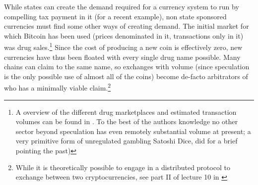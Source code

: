 While states can create the demand required for a currency system to run by compelling tax payment in it (for a recent example), non state sponsored currencies must find some other ways of creating demand.
The initial market for which Bitcoin has been used (prices denominated in it, transactions only in it) was drug sales.\footnote{A overview of the different drug marketplaces and estimated transaction volumes can be found in \cite{soska2015measuring}. To the best of the authors knowledge no other sector beyond speculation has even remotely substantial volume at present; a very primitive form of unregulated gambling Satoshi Dice, did for a brief pointing the past)   }
Since the cost of producing a new coin is effectively zero, new currencies have thus been floated with every single drug name possible. Many chains can claim to the same name, so exchanges with volume (since speculation is the only possible use of almost all of the coins) become de-facto arbitrators of who has a minimally viable claim.\footnote{While it is theoretically possible to engage in a distributed protocol to exchange between two cryptocurrencies, see part II of lecture 10 in \cite{princeton10}}






